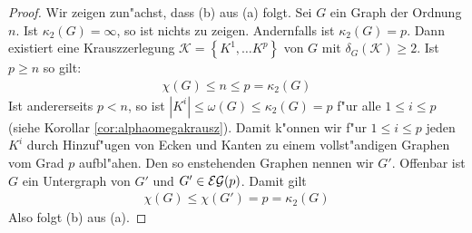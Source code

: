 \begin{proof}
  Wir zeigen zun"achst, dass (b) aus (a) folgt. Sei $G$ ein Graph der Ordnung $n$. Ist $\kappa_{2}(G) = \infty$, so ist nichts zu zeigen. Andernfalls ist $\kappa_{2}(G) =p$. Dann existiert eine Krauszzerlegung $\mathcal{K} = \left\{ K^1,\dots K^p \right\}$ von $G$ mit $\delta_G(\mathcal{K}) \geq 2$. Ist $p \geq n$ so gilt:
  \begin{align*}
    \chi(G) \leq n \leq p = \kappa_2 (G)
  \end{align*}
  Ist andererseits $p< n $, so ist $|K^{i}| \leq \omega (G)  \leq \kappa_2 (G) =  p$ f"ur alle $1\leq i \leq p$ (siehe Korollar \ref{cor:alphaomegakrausz}). Damit k"onnen wir f"ur $1\leq i \leq p$ jeden $K^{i}$ durch Hinzuf"ugen von Ecken und Kanten zu einem vollst"andigen Graphen vom Grad $p$ aufbl"ahen. Den so enstehenden Graphen nennen wir $G'$. Offenbar ist $G$ ein Untergraph von $G'$ und $G'\in {\cal EG}(p)$. Damit gilt 
  \begin{align*}
    \chi(G) \leq \chi (G') = p = \kappa_{2}(G)
  \end{align*}
  Also folgt (b) aus (a).  


\end{proof}
